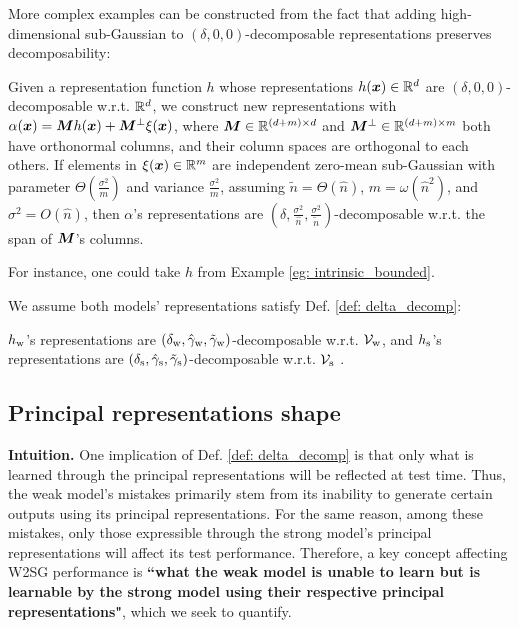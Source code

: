 More complex examples can be constructed from the fact that adding high-dimensional sub-Gaussian to $(\delta, 0, 0)$-decomposable representations preserves decomposability: 
\begin{theorem}\label{thm: construct_new}
Given a representation function
$h$ whose representations $h({\bm{x}})\in{\mathbb{R}}^d$ are $(\delta, 0, 0)$-decomposable w.r.t. ${\mathbb{R}}^d$, we construct new representations with $
   \alpha({\bm{x}}) = {\bm{M}} h({\bm{x}}) + {\bm{M}}^\perp \xi({\bm{x}})$,
where ${\bm{M}}\in{\mathbb{R}}^{(d+m)\times d}$ and ${\bm{M}}^\perp \in {\mathbb{R}}^{(d+m)\times m}$ both have orthonormal columns, and their column spaces are orthogonal to each others. If elements in $\xi({\bm{x}}) \in {\mathbb{R}}^m$ are independent zero-mean sub-Gaussian with parameter $\Theta(\frac{\sigma^2}{m})$ and variance $\frac{\sigma^2}{m}$, assuming $\tilde{n}\!=\!\Theta(\hat{n})$, $m\!=\!\omega(\hat{n}^2)$, and $\sigma^2\!=\!O(\hat{n})$, then $\alpha$'s representations are $(\delta, \frac{\sigma^2}{\hat{n}}, \frac{\sigma^2}{\tilde{n}})$-decomposable w.r.t. the span of ${\bm{M}}$'s columns. 
\end{theorem}
\begin{remark}
For instance, one could take $h$ from Example \ref{eg: intrinsic_bounded}.
\end{remark}

We assume both models' representations satisfy Def. \ref{def: delta_decomp}: 
\begin{assumption}\label{assump: weak_strong_decomp}
$h_{\text{w}}$'s representations are $(\delta_{\text{w}}, \hat{\gamma}_{\text{w}}, \tilde{\gamma}_{\text{w}})$-decomposable w.r.t. ${\mathcal{V}}_{\text{w}}$, and $h_{\text{s}}$'s representations are $(\delta_{\text{s}}, \hat{\gamma}_{\text{s}}, \tilde{\gamma}_{\text{s}})$-decomposable w.r.t. ${\mathcal{V}}_{\text{s}}$ .
\end{assumption}



\subsection{{Principal representations shape \predgap{}}}\label{subsec: main_result}

\textbf{Intuition.} One implication of Def. \ref{def: delta_decomp} is that only what is learned through the principal representations will be reflected at test time.  Thus, the weak model's mistakes primarily stem from its inability to generate certain outputs using its principal representations. For the same reason, among these mistakes, only those expressible through the strong model's principal representations will affect its test performance. Therefore, a key concept affecting W2SG performance is \textbf{``what the weak model is unable to learn but is learnable by the strong model using their respective principal representations"}, which we seek to quantify.

